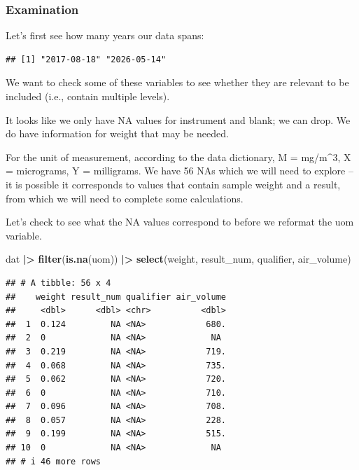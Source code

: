 \documentclass[
]{article}
\newenvironment{Shaded}{\begin{snugshade}}{\end{snugshade}}
\newcommand{\FunctionTok}[1]{\textcolor[rgb]{0.13,0.29,0.53}{\textbf{#1}}}
\newcommand{\NormalTok}[1]{#1}
\newcommand{\SpecialCharTok}[1]{\textcolor[rgb]{0.81,0.36,0.00}{\textbf{#1}}}
\begin{document}
\subsubsection{Examination}\label{examination}

Let's first see how many years our data spans:

\begin{Shaded}
\end{Shaded}

\begin{verbatim}
## [1] "2017-08-18" "2026-05-14"
\end{verbatim}

We want to check some of these variables to see whether they are
relevant to be included (i.e., contain multiple levels).

It looks like we only have NA values for instrument and blank; we can
drop. We do have information for weight that may be needed.

For the unit of measurement, according to the data dictionary, M =
mg/m\^{}3, X = micrograms, Y = milligrams. We have 56 NAs which we will
need to explore -- it is possible it corresponds to values that contain
sample weight and a result, from which we will need to complete some
calculations.

Let's check to see what the NA values correspond to before we reformat
the uom variable.

\begin{Shaded}
\begin{Highlighting}[]
\NormalTok{dat }\SpecialCharTok{|\textgreater{}} 
  \FunctionTok{filter}\NormalTok{(}\FunctionTok{is.na}\NormalTok{(uom)) }\SpecialCharTok{|\textgreater{}} 
  \FunctionTok{select}\NormalTok{(weight, result\_num, qualifier, air\_volume)}
\end{Highlighting}
\end{Shaded}

\begin{verbatim}
## # A tibble: 56 x 4
##    weight result_num qualifier air_volume
##     <dbl>      <dbl> <chr>          <dbl>
##  1  0.124         NA <NA>            680.
##  2  0             NA <NA>             NA 
##  3  0.219         NA <NA>            719.
##  4  0.068         NA <NA>            735.
##  5  0.062         NA <NA>            720.
##  6  0             NA <NA>            710.
##  7  0.096         NA <NA>            708.
##  8  0.057         NA <NA>            228.
##  9  0.199         NA <NA>            515.
## 10  0             NA <NA>             NA 
## # i 46 more rows
\end{verbatim}
\end{document}
